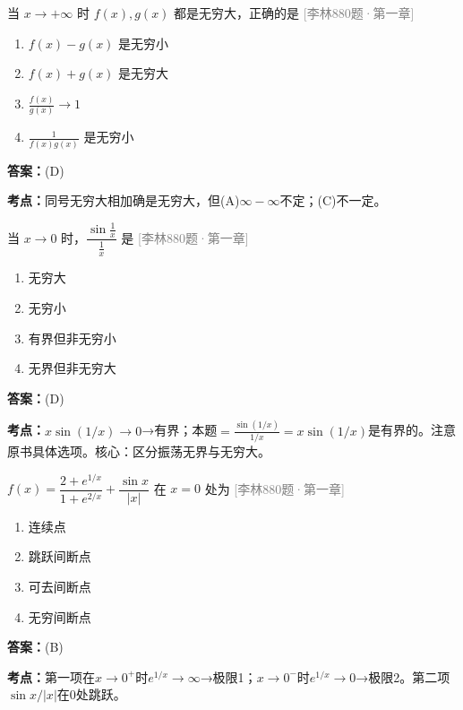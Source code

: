 \documentclass[12pt,a4paper]{ctexbook}
\newcommand{\src}[1]{\hfill\textcolor{gray}{\small\textsf{[#1]}}}
\newcommand{\ans}[1]{\begin{answerbox}\textbf{答案：}#1\end{answerbox}}
\newcommand{\kpt}[1]{\textbf{考点：}#1}
\begin{document}
\bigskip

\begin{exercise}[880题·无穷大的四则运算]
当 $x\to+\infty$ 时 $f(x),g(x)$ 都是无穷大，正确的是 \hfill\src{李林880题·第一章}
\begin{enumerate}[label=(\Alph*),nosep]
  \item $f(x)-g(x)$ 是无穷小
  \item $f(x)+g(x)$ 是无穷大
  \item $\frac{f(x)}{g(x)}\to 1$
  \item $\frac{1}{f(x)g(x)}$ 是无穷小
\end{enumerate}
\end{exercise}
\ans{(D)}
\kpt{同号无穷大相加确是无穷大，但(A)$\infty-\infty$不定；(C)不一定。}

\bigskip

\begin{exercise}[880题·振荡型无界函数]
当 $x\to 0$ 时，$\dfrac{\sin\frac{1}{x}}{\frac{1}{x}}$ 是 \hfill\src{李林880题·第一章}
\begin{enumerate}[label=(\Alph*),nosep]
  \item 无穷大
  \item 无穷小
  \item 有界但非无穷小
  \item 无界但非无穷大
\end{enumerate}
\end{exercise}
\ans{(D)}
\kpt{$x\sin(1/x)\to 0$→有界；本题$=\frac{\sin(1/x)}{1/x}=x\sin(1/x)$是有界的。注意原书具体选项。核心：区分振荡无界与无穷大。}

\bigskip

\begin{exercise}[880题·间断点分类]
$f(x)=\dfrac{2+e^{1/x}}{1+e^{2/x}}+\dfrac{\sin x}{|x|}$ 在 $x=0$ 处为 \hfill\src{李林880题·第一章}
\begin{enumerate}[label=(\Alph*),nosep]
  \item 连续点
  \item 跳跃间断点
  \item 可去间断点
  \item 无穷间断点
\end{enumerate}
\end{exercise}
\ans{(B)}
\kpt{第一项在$x\to 0^+$时$e^{1/x}\to\infty$→极限1；$x\to 0^-$时$e^{1/x}\to 0$→极限2。第二项$\sin x/|x|$在0处跳跃。}

\bigskip
\end{document}
